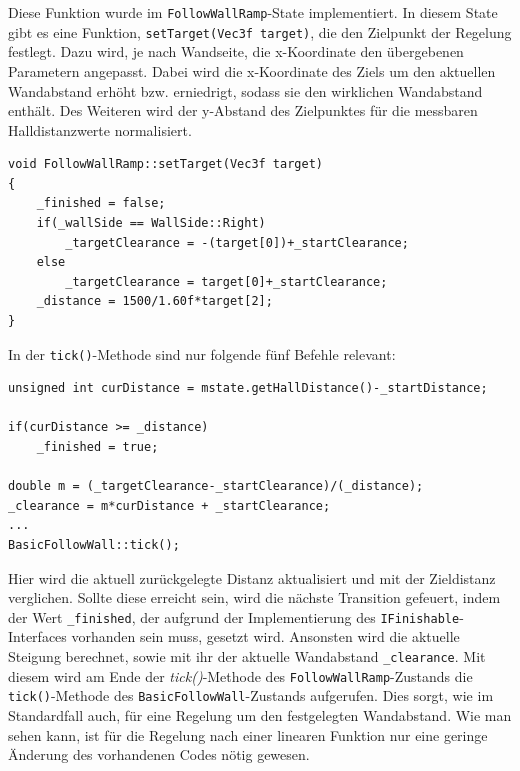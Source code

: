 \newline
\newline
Diese Funktion wurde im \texttt{FollowWallRamp}-State implementiert. In diesem State gibt es eine Funktion, \texttt{setTarget(Vec3f target)}, die den Zielpunkt der Regelung festlegt. Dazu wird, je nach Wandseite, die x-Koordinate den übergebenen Parametern angepasst. Dabei wird die x-Koordinate des Ziels um den aktuellen Wandabstand erhöht bzw. erniedrigt, sodass sie den wirklichen Wandabstand enthält. Des Weiteren wird der y-Abstand des Zielpunktes für die messbaren Halldistanzwerte normalisiert.
\newpage
\begin{lstlisting}
void FollowWallRamp::setTarget(Vec3f target)
{
	_finished = false;
	if(_wallSide == WallSide::Right)
		_targetClearance = -(target[0])+_startClearance;
	else
		_targetClearance = target[0]+_startClearance;
	_distance = 1500/1.60f*target[2];
}
\end{lstlisting}

In der \texttt{tick()}-Methode sind nur folgende fünf Befehle relevant:

\begin{lstlisting}
unsigned int curDistance = mstate.getHallDistance()-_startDistance;

if(curDistance >= _distance)
	_finished = true;

double m = (_targetClearance-_startClearance)/(_distance);
_clearance = m*curDistance + _startClearance;
...
BasicFollowWall::tick();
\end{lstlisting}

Hier wird die aktuell zurückgelegte Distanz aktualisiert und mit der Zieldistanz verglichen. Sollte diese erreicht sein, wird die nächste Transition gefeuert, indem der Wert \texttt{\_finished}, der aufgrund der Implementierung des \texttt{IFinishable}-Interfaces vorhanden sein muss, gesetzt wird. Ansonsten wird die aktuelle Steigung berechnet, sowie mit ihr der aktuelle Wandabstand \texttt{\_clearance}. Mit diesem wird am Ende der \textit{tick()}-Methode des \texttt{FollowWallRamp}-Zustands die \texttt{tick()}-Methode des \texttt{BasicFollowWall}-Zustands aufgerufen. Dies sorgt, wie im Standardfall auch, für eine Regelung um den festgelegten Wandabstand. 
\newline
Wie man sehen kann, ist für die Regelung nach einer linearen Funktion nur eine geringe Änderung des vorhandenen Codes nötig gewesen. 
\newline

